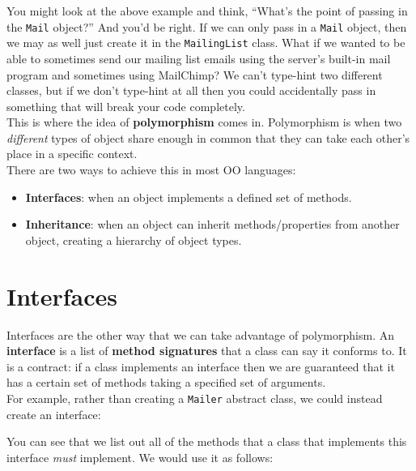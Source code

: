 You might look at the above example and think, ``What's the point of passing in the \texttt{Mail} object?'' And you'd be right. If we can only pass in a \texttt{Mail} object, then we may as well just create it in the \texttt{MailingList} class. What if we wanted to be able to sometimes send our mailing list emails using the server's built-in mail program and sometimes using MailChimp? We can't type-hint two different classes, but if we don't type-hint at all then you could accidentally pass in something that will break your code completely.
\\

This is where the idea of \textbf{polymorphism} comes in. Polymorphism is when two \textit{different} types of object share enough in common that they can take each other's place in a specific context.
\\

There are two ways to achieve this in most OO languages:

\begin{itemize}
    \item \textbf{Interfaces}: when an object implements a defined set of methods.
    \item \textbf{Inheritance}: when an object can inherit methods/properties from another object, creating a hierarchy of object types.
\end{itemize}




\section{Interfaces}

Interfaces are the other way that we can take advantage of polymorphism. An \textbf{interface} is a list of \textbf{method signatures} that a class can say it conforms to. It is a contract: if a class implements an interface then we are guaranteed that it has a certain set of methods taking a specified set of arguments.
\\

For example, rather than creating a \texttt{Mailer} abstract class, we could instead create an interface:


You can see that we list out all of the methods that a class that implements this interface \textit{must} implement. We would use it as follows:


